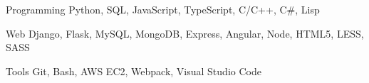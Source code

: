 

\begin{cvskills}

  \cvskill
    {Programming} %
    {Python, SQL, JavaScript, TypeScript, C/C++, C\#, Lisp} %

  \cvskill
    {Web} %
    {Django, Flask, MySQL, MongoDB, Express, Angular, Node, HTML5, LESS, SASS} %

  \cvskill
    {Tools} %
    {Git, Bash, AWS EC2, Webpack, Visual Studio Code} %

\end{cvskills}
